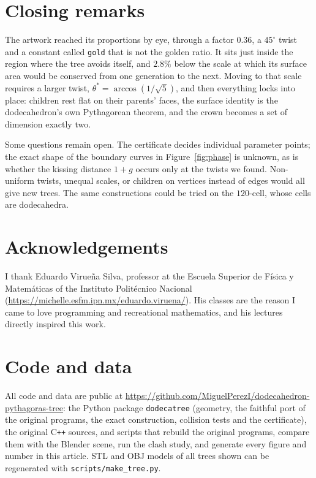 \documentclass[11pt,a4paper]{article}
\theoremstyle{definition}
\theoremstyle{remark}
\begin{document}
\section{Closing remarks}

The artwork reached its proportions by eye, through a factor $0.36$, a
$45^\circ$ twist and a constant called \texttt{gold} that is not the golden
ratio.  It sits just inside the region where the tree avoids itself, and
$2.8\%$ below the scale at which its surface area would be conserved from one
generation to the next.  Moving to that scale requires a larger twist,
$\theta^*=\arccos(1/\sqrt5)$, and then everything locks into place: children
rest flat on their parents' faces, the surface identity is the dodecahedron's
own Pythagorean theorem, and the crown becomes a set of dimension exactly two.

Some questions remain open.  The certificate decides individual parameter
points; the exact shape of the boundary curves in Figure~\ref{fig:phase} is
unknown, as is whether the kissing distance $1+g$ occurs only at the twists
we found.  Non-uniform twists, unequal scales, or children on vertices
instead of edges would all give new trees.  The same constructions could be
tried on the $120$-cell, whose cells are dodecahedra.

\section*{Acknowledgements}

I thank Eduardo Virue\~na Silva, professor at the Escuela Superior de F\'isica
y Matem\'aticas of the Instituto Polit\'ecnico Nacional
(\url{https://michelle.esfm.ipn.mx/eduardo.viruena/}).  His classes are the
reason I came to love programming and recreational mathematics, and his
lectures directly inspired this work.

\section*{Code and data}

All code and data are public at
\url{https://github.com/MiguelPerezI/dodecahedron-pythagoras-tree}: the Python
package \texttt{dodecatree} (geometry, the faithful port of the original
programs, the exact construction, collision tests and the certificate), the
original C\texttt{++} sources, and scripts that rebuild the original programs,
compare them with the Blender scene, run the clash study, and generate every
figure and number in this article.  STL and OBJ models of all trees shown can
be regenerated with \texttt{scripts/make\_tree.py}.
\end{document}
